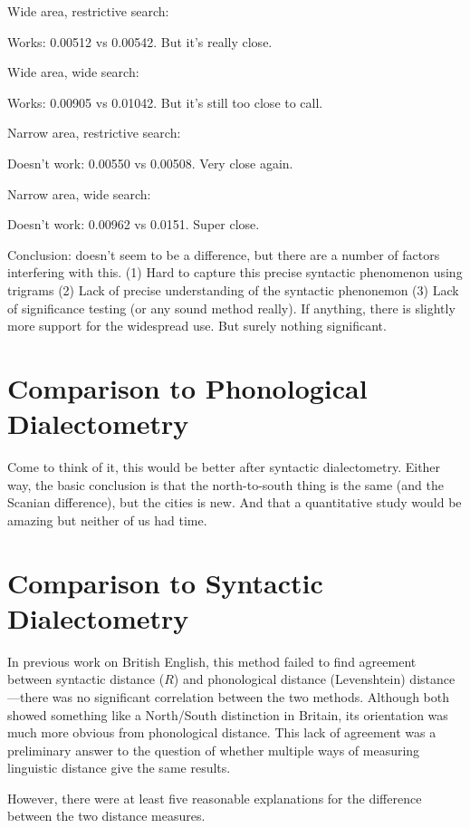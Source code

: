 Wide area, restrictive search:

Works: 0.00512 vs 0.00542. But it's really close.

Wide area, wide search:

Works: 0.00905 vs 0.01042. But it's still too close to call.

Narrow area, restrictive search:

Doesn't work: 0.00550 vs 0.00508. Very close again.

Narrow area, wide search:

Doesn't work: 0.00962 vs 0.0151. Super close.

Conclusion: doesn't seem to be a difference, but there are a number of
factors interfering with this. (1) Hard to capture this precise
syntactic phenomenon using trigrams (2) Lack of
precise understanding of the syntactic phenonemon (3) Lack of
significance testing (or any sound method really).
If anything, there is slightly more support for the widespread
use. But surely nothing significant.

\section{Comparison to Phonological Dialectometry}

Come to think of it, this would be better after syntactic
dialectometry. Either way, the basic conclusion is that the
north-to-south thing is the same (and the Scanian difference), but the
cities is new. And that a quantitative study would be amazing but
neither of us had time.

\section{Comparison to Syntactic Dialectometry}

In previous work on British English, this method failed to find
agreement between syntactic distance ($R$) and phonological distance
(Levenshtein) distance---there was no
significant correlation between the two methods. Although both showed
something like a North/South distinction in Britain, its orientation was much more
obvious from phonological distance. This lack of agreement was a
preliminary answer to the question of whether multiple
ways of measuring linguistic distance give the same results.

However, there were at least five reasonable explanations for the difference
between the two distance measures.

